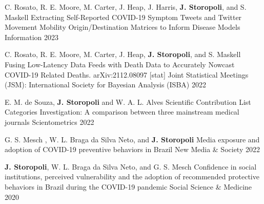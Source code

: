 

\begin{cventries}

	\cventry
	{C. Rosato, R. E. Moore, M. Carter, J. Heap, J. Harris, \textbf{J. Storopoli}, and S. Maskell} %
	{Extracting Self-Reported COVID-19 Symptom Tweets and Twitter Movement Mobility Origin/Destination Matrices to Inform Disease Models} %
	{Information} %
	{2023} %

	\cventry
	{C. Rosato, R. E. Moore, M. Carter, J. Heap, \textbf{J. Storopoli}, and S. Maskell} %
	{Fusing Low-Latency Data Feeds with Death Data to Accurately Nowcast COVID-19 Related Deaths. arXiv:2112.08097 [stat]} %
	{Joint Statistical Meetings (JSM): International Society for Bayesian Analysis (ISBA)} %
	{2022} %

	\cventry
	{E. M. de Souza, \textbf{J. Storopoli} and W. A. L. Alves} %
	{Scientific Contribution List Categories Investigation: A comparison between three mainstream medical journals} %
	{Scientometrics} %
	{2022} %

	\cventry
	{G. S. Mesch , W. L. Braga da Silva Neto, and \textbf{J. Storopoli}} %
	{Media exposure and adoption of COVID-19 preventive behaviors in Brazil} %
	{New Media \& Society} %
	{2022} %

	\cventry
	{\textbf{J. Storopoli}, W. L. Braga da Silva Neto, and G. S. Mesch} %
	{Confidence in social institutions, perceived vulnerability and the adoption of recommended protective behaviors in Brazil during the COVID-19 pandemic} %
	{Social Science \& Medicine} %
	{2020} %

\end{cventries}
